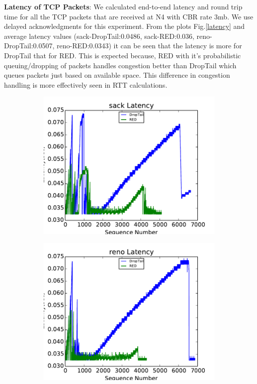 \documentclass[USenglish,oneside,twocolumn]{article}
\begin{document}
\noindent \textbf{Latency of TCP Packets}: We calculated end-to-end latency and round trip time for all the TCP packets that are received at N4 with CBR rate 3mb. We use delayed acknowledgments\cite{DelAck} for this experiment. From the plots Fig.\ref{latency} and average latency values (sack-DropTail:0.0486, sack-RED:0.036, reno-DropTail:0.0507, reno-RED:0.0343) it can be seen that the latency is more for DropTail that for RED. This is expected because, RED with it's probabilistic queuing/dropping of packets handles congestion better than DropTail which queues packets just based on available space. This difference in congestion handling is more effectively seen in RTT calculations.\\
\begin{figure}
\captionsetup{justification=centering}
    \centering
    \begin{subfigure}{0.5\linewidth}
        \centering
        \includegraphics[width=\linewidth]{fig/sack_latency.pdf} %
    \end{subfigure}
    \begin{subfigure}{0.48\linewidth}
        \centering
        \includegraphics[width=\linewidth]{fig/reno_latency.pdf} %

\end{subfigure}
\end{figure}
\end{document}
